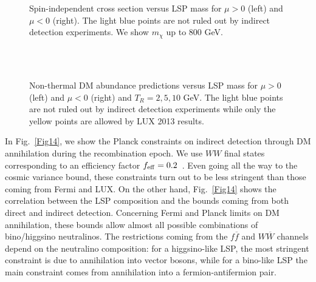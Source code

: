 \documentclass[12pt,a4paper]{book}
\begin{document}
\begin{figure}
\centering
{} \quad
{} \\
 \quad
{} \\
 \quad
{}
\caption{Spin-independent cross section versus LSP mass for $\mu>0$ (left) and $\mu<0$ (right). The light blue points are not ruled out by indirect detection experiments. We show $m_{\chi}$ up to 800 GeV.}
\label{Fig12}
\end{figure}

\begin{figure}
\centering
{} \quad
{} \\
 \quad
{} \\
 \quad
{}
\caption{Non-thermal DM abundance predictions versus LSP mass for $\mu>0$ (left) and $\mu<0$ (right) and $T_R=2, 5, 10$ GeV. The light blue points are not ruled out by indirect detection experiments while only the yellow points are allowed by LUX 2013 results.}
\label{Fig13}
\end{figure}


In Fig.~\ref{Fig14}, we show the Planck constraints on indirect detection through DM annihilation during the recombination epoch. We use $WW$ final states corresponding to an efficiency factor $f_{\rm eff}= 0.2$~\cite{Madhavacheril:2013cna}. Even going all the way to the cosmic variance bound, these constraints turn out to be less stringent than those coming from Fermi and LUX. On the other hand, Fig.~\ref{Fig14} shows the correlation between the LSP composition and the bounds coming from both direct and indirect detection. Concerning Fermi and Planck limits on DM annihilation, these bounds allow almost all possible combinations of bino/higgsino neutralinos. The restrictions coming from the $f \overline{f}$ and $W\overline{W}$ channels depend on the neutralino composition: for a higgsino-like LSP, the most stringent constraint is due to annihilation into vector bosons, while for a bino-like LSP the main constraint comes from annihilation into a fermion-antifermion pair.\\
\end{document}
